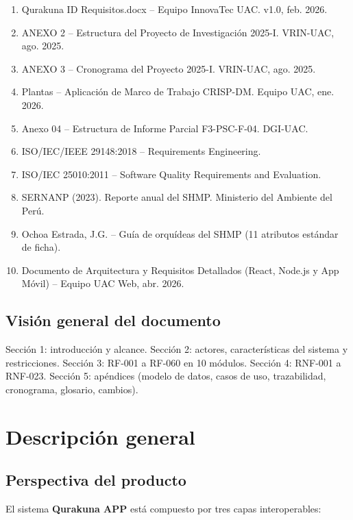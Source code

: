 \documentclass[12pt, a4paper]{article}
\begin{document}
\begin{enumerate}
  \item Qurakuna ID Requisitos.docx -- Equipo InnovaTec UAC. v1.0, feb. 2026.
  \item ANEXO 2 -- Estructura del Proyecto de Investigaci\'on 2025-I. VRIN-UAC, ago. 2025.
  \item ANEXO 3 -- Cronograma del Proyecto 2025-I. VRIN-UAC, ago. 2025.
  \item Plantas -- Aplicaci\'on de Marco de Trabajo CRISP-DM. Equipo UAC, ene. 2026.
  \item Anexo 04 -- Estructura de Informe Parcial F3-PSC-F-04. DGI-UAC.
  \item ISO/IEC/IEEE 29148:2018 -- Requirements Engineering.
  \item ISO/IEC 25010:2011 -- Software Quality Requirements and Evaluation.
  \item SERNANP (2023). Reporte anual del SHMP. Ministerio del Ambiente del Per\'u.
  \item Ochoa Estrada, J.G. -- Gu\'ia de orqu\'ideas del SHMP (11 atributos est\'andar de ficha).
  \item Documento de Arquitectura y Requisitos Detallados (React, Node.js y App M\'ovil) -- Equipo UAC Web, abr. 2026.
\end{enumerate}

\subsection{Visi\'on general del documento}

Secci\'on 1: introducci\'on y alcance. Secci\'on 2: actores, caracter\'isticas del sistema y restricciones. 
Secci\'on 3: RF-001 a RF-060 en 10 m\'odulos. Secci\'on 4: RNF-001 a RNF-023. Secci\'on 5: ap\'endices (modelo de datos, casos de uso, trazabilidad, cronograma, glosario, cambios).

\section{Descripci\'on general}

\subsection{Perspectiva del producto}

El sistema \textbf{Qurakuna APP} est\'a compuesto por tres capas interoperables:
\end{document}
